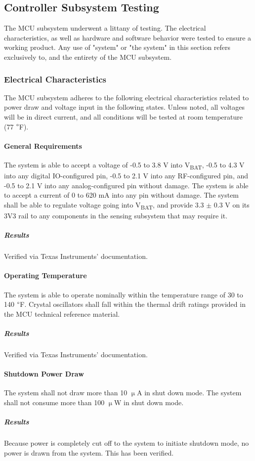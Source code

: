 \subsection{Controller Subsystem Testing}
\label{sec:controller_subsystem_testing}
The MCU subsystem underwent a littany of testing. The electrical
characteristics, as well as hardware and software behavior were tested to
ensure a working product. Any use of "system" or "the system" in this section refers exclusively to, and the entirety of the MCU subsystem.

\subsubsection{Electrical Characteristics}
The MCU subsystem adheres to the following electrical characteristics
related to power draw and voltage input in the following states. Unless noted,
all voltages will be in direct current, and all conditions will be tested at
room temperature (77 $\degree$F). 

\paragraph{General Requirements} The system is able to accept a voltage
of -0.5 to 3.8 V into V\textsubscript{BAT}, -0.5 to 4.3 V into any digital
IO-configured pin, -0.5 to 2.1 V into any RF-configured pin, and -0.5 to 2.1 V
into any analog-configured pin without damage. The system is able to
accept a current of 0 to 620 mA into any pin without damage. The system shall
be able to regulate voltage going into V\textsubscript{BAT}, and provide 3.3 $\pm$ 0.3 V
on its 3V3 rail to any components in the sensing
subsystem that may require it.
\subparagraph{Results} Verified via Texas Instruments' documentation.

\paragraph{Operating Temperature} The system is able to operate
nominally within the temperature range of 30 to 140 $\degree$F. Crystal
oscillators shall fall within the thermal drift ratings provided in the
MCU technical reference material.
\subparagraph{Results} Verified via Texas Instruments' documentation.

\paragraph{Shutdown Power Draw} The system shall not draw more than 10
$\upmu$A in shut down mode. The system shall not consume more than 100
$\upmu$W in shut down mode.
\subparagraph{Results} Because power is completely cut off to the system to initiate shutdown mode, no power is drawn from the system. This has been verified.

